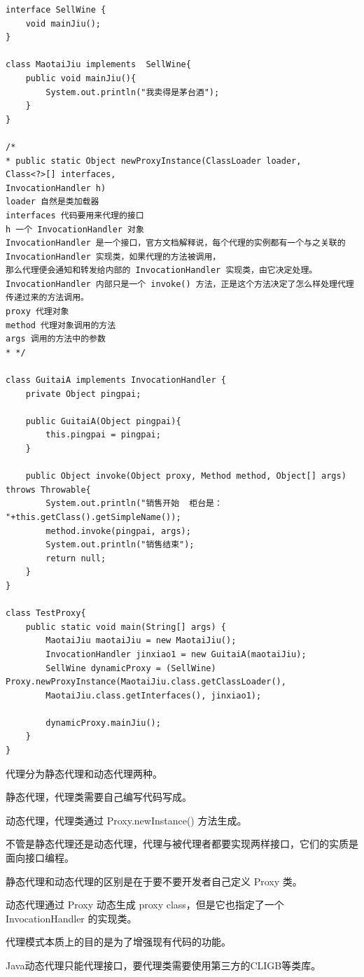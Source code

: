 \documentclass[UTF8]{ctexart}
\begin{document}
\begin{lstlisting}
interface SellWine {
	void mainJiu();
}

class MaotaiJiu implements  SellWine{
	public void mainJiu(){
		System.out.println("我卖得是茅台酒");
	}
}

/*
* public static Object newProxyInstance(ClassLoader loader,
Class<?>[] interfaces,
InvocationHandler h)
loader 自然是类加载器
interfaces 代码要用来代理的接口
h 一个 InvocationHandler 对象
InvocationHandler 是一个接口，官方文档解释说，每个代理的实例都有一个与之关联的
InvocationHandler 实现类，如果代理的方法被调用，
那么代理便会通知和转发给内部的 InvocationHandler 实现类，由它决定处理。
InvocationHandler 内部只是一个 invoke() 方法，正是这个方法决定了怎么样处理代理传递过来的方法调用。
proxy 代理对象
method 代理对象调用的方法
args 调用的方法中的参数
* */

class GuitaiA implements InvocationHandler {
	private Object pingpai;
	
	public GuitaiA(Object pingpai){
		this.pingpai = pingpai;
	}
	
	public Object invoke(Object proxy, Method method, Object[] args) throws Throwable{
		System.out.println("销售开始  柜台是： "+this.getClass().getSimpleName());
		method.invoke(pingpai, args);
		System.out.println("销售结束");
		return null;
	}
}

class TestProxy{
	public static void main(String[] args) {
		MaotaiJiu maotaiJiu = new MaotaiJiu();
		InvocationHandler jinxiao1 = new GuitaiA(maotaiJiu);
		SellWine dynamicProxy = (SellWine) Proxy.newProxyInstance(MaotaiJiu.class.getClassLoader(),
		MaotaiJiu.class.getInterfaces(), jinxiao1);
		
		dynamicProxy.mainJiu();
	}
}
\end{lstlisting}


代理分为静态代理和动态代理两种。

静态代理，代理类需要自己编写代码写成。

动态代理，代理类通过 Proxy.newInstance() 方法生成。

不管是静态代理还是动态代理，代理与被代理者都要实现两样接口，它们的实质是面向接口编程。

静态代理和动态代理的区别是在于要不要开发者自己定义 Proxy 类。

动态代理通过 Proxy 动态生成 proxy class，但是它也指定了一个 InvocationHandler 的实现类。

代理模式本质上的目的是为了增强现有代码的功能。

Java动态代理只能代理接口，要代理类需要使用第三方的CLIGB等类库。
\end{document}

